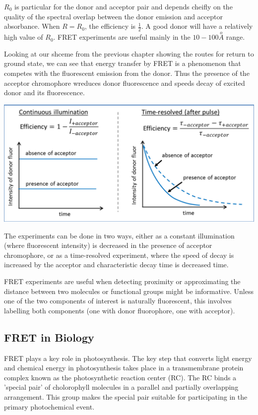 \documentclass[12pt, letterpaper]{article}
\begin{document}
$R_0$ is particular for the donor and acceptor pair and depends cheifly on the quality of the spectral overlap between the donor emission and acceptor absorbance. 
When \( R = R_0 \), the efficiency is $\frac{1}{2}$. A good donor will have a relatively high value of $R_0$. FRET experiments are useful mainly in the $10 - 100 \stackrel{o} A$ range. 

\newpage

Looking at our shceme from the previous chapter showing the routes for return to ground state, we can see that energy transfer by FRET is a phenomenon that competes with 
the fluorescent emission from the donor. Thus the presence of the acceptor chromophore wreduces donor fluorescence and speeds decay of excited donor and its fluorescence. 

\begin{center}
    \includegraphics[scale = 0.5]{fret 2.png}
\end{center}

The experiments can be done in two ways, either as a constant illumination (where fluorescent intensity) is decreased in the presence of acceptor chromophore, or as a time-resolved experiment,
where the speed of decay is increased by the acceptor and characteristic decay time is decreased time. 

FRET experiments are useful when detecting proximity or approximating the distance between two molecules or functional groups might be informative. Unless one of the two components of interest is
naturally fluorescent, this involves labelling both components (one with donor fluorophore, one with acceptor). 

\subsection*{FRET in Biology}

FRET plays a key role in photosynthesis. The key step that converts light energy and chemical energy in photosynthesis takes place in a transmembrane protein complex known as the photosynthetic reaction center (RC). 
The RC binds a 'special pair' of cholorophyll molecules in a parallel and partially overlapping arrangement. This group makes the special pair suitable for participating in the primary photochemical event. 
\end{document}
